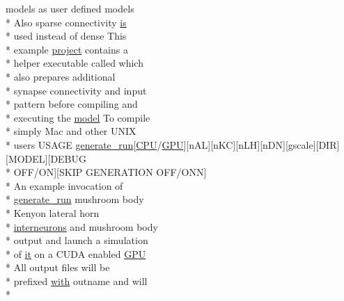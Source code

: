 \begin{DoxyCompactItemize}
models as user defined models \\*
Also sparse connectivity \hyperlink{userproject_2MBody__userdef__project_2README_8txt_a7b4e6cf78d14ce882cb8ff127e01babd}{is} \\*
used instead of dense This \\*
example \hyperlink{userproject_2SynDelay__project_2README_8txt_a762c750134e07a31b7965860fd292b51}{project} contains a \\*
helper executable called which \\*
also prepares additional \\*
synapse connectivity and input \\*
pattern before compiling and \\*
executing the \hyperlink{README_8txt_a69fd801b7213948c12d9dd7eebb3ed14}{model} To compile \\*
simply Mac and other U\+N\+I\+X \\*
users U\+S\+A\+G\+E \hyperlink{userproject_2MBody__userdef__project_2README_8txt_a320a215d1e27b4de394be70e90d22863}{generate\+\_\+run}\mbox{[}\hyperlink{README_8txt_a74a069e3c75797de2636c4dd14daa147}{C\+P\+U}/\hyperlink{modelSpec_8h_a39cb9803524b6f3b783344b2f89867b4}{G\+P\+U}\mbox{]}\mbox{[}n\+A\+L\mbox{]}\mbox{[}n\+K\+C\mbox{]}\mbox{[}n\+L\+H\mbox{]}\mbox{[}n\+D\+N\mbox{]}\mbox{[}gscale\mbox{]}\mbox{[}D\+I\+R\mbox{]}\mbox{[}M\+O\+D\+E\+L\mbox{]}\mbox{[}D\+E\+B\+U\+G \\*
O\+F\+F/O\+N\mbox{]}\mbox{[}S\+K\+I\+P G\+E\+N\+E\+R\+A\+T\+I\+O\+N O\+F\+F/O\+N\+N\mbox{]} \\*
An example invocation of \\*
\hyperlink{userproject_2MBody__userdef__project_2README_8txt_a320a215d1e27b4de394be70e90d22863}{generate\+\_\+run} mushroom body \\*
Kenyon lateral horn \\*
\hyperlink{userproject_2SynDelay__project_2README_8txt_adf6327d22e2c11a62a22ab5afd4f2b81}{interneurons} and mushroom body \\*
output and launch a simulation \\*
of \hyperlink{userproject_2PoissonIzh__project_2README_8txt_a3e3bbb6c9b14c38757cf273a117e43e8}{it} on a C\+U\+D\+A enabled \hyperlink{modelSpec_8h_a39cb9803524b6f3b783344b2f89867b4}{G\+P\+U} \\*
All output files will be \\*
prefixed \hyperlink{userproject_2OneComp__project_2README_8txt_ace09bb40fbf4457ad9a9340a67a4fa9a}{with} outname and will \\*

\end{DoxyCompactItemize}
